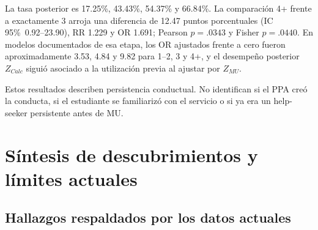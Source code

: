 \documentclass[11pt,letterpaper]{article}
\newcommand{\CI}{IC 95\%}
\begin{document}
La tasa posterior es 17.25\%, 43.43\%, 54.37\% y 66.84\%. La comparación 4+ frente a exactamente 3 arroja una diferencia de 12.47 puntos porcentuales (\CI\ 0.92--23.90), RR 1.229 y OR 1.691; Pearson $p=.0343$ y Fisher $p=.0440$. En modelos documentados de esa etapa, los OR ajustados frente a cero fueron aproximadamente 3.53, 4.84 y 9.82 para 1--2, 3 y 4+, y el desempeño posterior $Z_{Calc}$ siguió asociado a la utilización previa al ajustar por $Z_{MU}$.

Estos resultados describen persistencia conductual. No identifican si el PPA creó la conducta, si el estudiante se familiarizó con el servicio o si ya era un help-seeker persistente antes de MU.

\section{Síntesis de descubrimientos y límites actuales}

\subsection{Hallazgos respaldados por los datos actuales}
\end{document}
